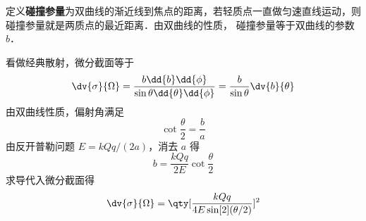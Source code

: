 
\begin{issues}
\issueDraft
\end{issues}


定义\textbf{碰撞参量}为双曲线的渐近线到焦点的距离，若轻质点一直做匀速直线运动，则碰撞参量就是两质点的最近距离．由双曲线的性质，%
碰撞参量等于双曲线的参数 $b$．

看做经典散射，微分截面等于
\begin{equation}
\dv{\sigma}{\Omega} = \frac{b \dd{b}\dd{\phi} }{\sin \theta \dd{\theta} \dd{\phi} } = \frac{b}{\sin \theta }\dv{b}{\theta}
\end{equation}
由双曲线性质，偏射角满足
\begin{equation}
\cot{\frac{\theta }{2}}= \frac{b}{a}
\end{equation}
由反开普勒问题  $E = kQq/(2a)$，消去 $a$ 得
\begin{equation}
b = \frac{kQq}{2E}\cot {\frac{\theta }{2}}
\end{equation}
求导代入微分截面得
\begin{equation}
\dv{\sigma}{\Omega} = \qty[ \frac{kQq}{4E \sin[2](\theta /2)} ]^2
\end{equation}
